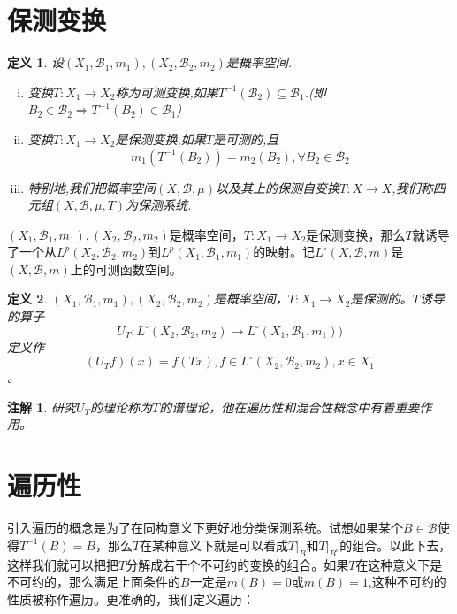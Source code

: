 \documentclass[a4paper,11pt,oneside]{book}
\newtheorem{definition}{\textbf{\hspace{0.7cm}定义}}[section]
\newtheorem{remark}{\textbf{\hspace{0.7cm}注解}}[section]
\newcommand{\ms}[1]{\mathscr{#1}}
\begin{document}
\section{保测变换}
\begin{definition}
设$(X_1,\ms{B}_1,m_1),(X_2,\mathscr{B}_2,m_2)$是概率空间.
\begin{enumerate}[(i)]
\item 变换$T:X_1 \rightarrow X_2$称为可测变换,如果$T^{-1}(\mathscr{B}_2) \subseteq \mathscr{B}_1$.(即\
$B_2 \in \mathscr{B}_2\Rightarrow T^{-1}(B_2) \in \mathscr{B}_1$)
\item 变换$T:X_1 \rightarrow X_2$是保测变换,如果$T$是可测的,且
$$m_1(T^{-1}(B_2))=m_2(B_2), \forall B_2 \in \mathscr{B}_2$$
\item 特别地,我们把概率空间$(X,\ms{B},\mu)$以及其上的保测自变换$T:X\rightarrow X$,我们称四元组$(X,\ms{B},\mu,T)$为保测系统.
\end{enumerate}
\end{definition}



$(X_1,\mathscr{B}_1,m_1),(X_2,\mathscr{B}_2,m_2)$是概率空间，$T:X_1 \rightarrow X_2$是保测变换，那么$T$就诱导了一个从$L^p(X_2,\mathscr{B}_2,m_2)$到$L^p(X_1,\mathscr{B}_1,m_1)$的映射。记$L^{\circ}(X,\ms{B},m)$是$(X,\ms{B},m)$上的可测函数空间。

\begin{definition}
$(X_1,\mathscr{B}_1,m_1),(X_2,\mathscr{B}_2,m_2)$是概率空间，$T:X_1 \rightarrow X_2$是保测的。$T$诱导的算子$$U_T:L^{\circ}(X_2,\ms{B}_2,m_2)\rightarrow L^{\circ}(X_1,\ms{B}_1,m_1))$$定义作$$(U_Tf)(x)=f(Tx),f\in L^{\circ}(X_2,\ms{B}_2,m_2),x\in X_1$$。

\end{definition}
\begin{remark}
研究$U_T$的理论称为$T$的谱理论，他在遍历性和混合性概念中有着重要作用。
\end{remark}



\section{遍历性}
引入遍历的概念是为了在同构意义下更好地分类保测系统。试想如果某个$B\in\ms{B}$使得$T^{-1}(B)=B$，那么$T$在某种意义下就是可以看成$T|_B$和$T|_{B^{c}}$的组合。以此下去，这样我们就可以把把$T$分解成若干个不可约的变换的组合。如果$T$在这种意义下是不可约的，那么满足上面条件的$B$一定是$m(B)=0$或$m(B)=1$,这种不可约的性质被称作遍历。更准确的，我们定义遍历：
\end{document}
